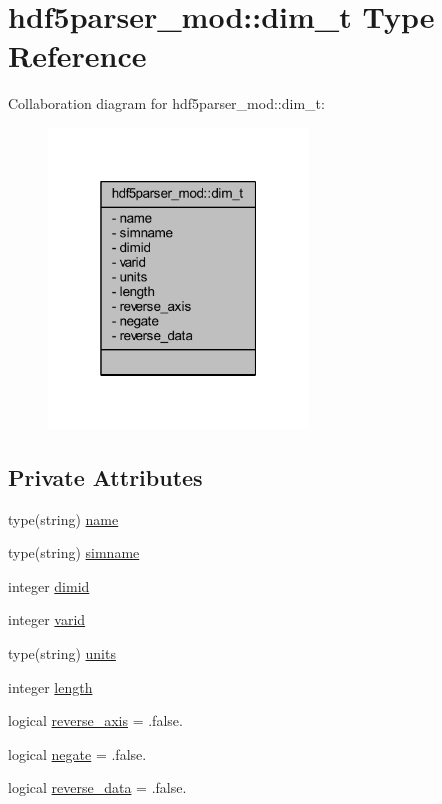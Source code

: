 \hypertarget{structhdf5parser__mod_1_1dim__t}{}\section{hdf5parser\+\_\+mod\+:\+:dim\+\_\+t Type Reference}
\label{structhdf5parser__mod_1_1dim__t}


Collaboration diagram for hdf5parser\+\_\+mod\+:\+:dim\+\_\+t\+:\nopagebreak
\begin{figure}[H]
\begin{center}
\leavevmode
\includegraphics[width=196pt]{structhdf5parser__mod_1_1dim__t__coll__graph}
\end{center}
\end{figure}
\subsection*{Private Attributes}
\begin{DoxyCompactItemize}
\item 
type(string) \mbox{\hyperlink{structhdf5parser__mod_1_1dim__t_af82c024d2e798ff746323b452200ed8a}{name}}
\item 
type(string) \mbox{\hyperlink{structhdf5parser__mod_1_1dim__t_aeb6fdf1f04e170d43fbc722d4ae59506}{simname}}
\item 
integer \mbox{\hyperlink{structhdf5parser__mod_1_1dim__t_a402fcbdd52f0392979b83f9f71ac30fd}{dimid}}
\item 
integer \mbox{\hyperlink{structhdf5parser__mod_1_1dim__t_a19157b960547496c13ee1e993bb4e45b}{varid}}
\item 
type(string) \mbox{\hyperlink{structhdf5parser__mod_1_1dim__t_a8377ba017999543e0e88e8150b52bbcd}{units}}
\item 
integer \mbox{\hyperlink{structhdf5parser__mod_1_1dim__t_a8276f33602c9c8180cf7e9a254d995e5}{length}}
\item 
logical \mbox{\hyperlink{structhdf5parser__mod_1_1dim__t_aa2ffb242a2b82c252e798cb4d91ab42b}{reverse\+\_\+axis}} = .false.
\item 
logical \mbox{\hyperlink{structhdf5parser__mod_1_1dim__t_af8ff310749748c50a17fcc670b18d91f}{negate}} = .false.
\item 
logical \mbox{\hyperlink{structhdf5parser__mod_1_1dim__t_a0df3af6d29b3e007af8ce2cf4811b605}{reverse\+\_\+data}} = .false.
\end{DoxyCompactItemize}


